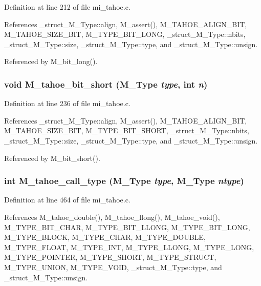 Definition at line 212 of file mi\_\-tahoe.c.

References \_\-struct\_\-M\_\-Type::align, M\_\-assert(), M\_\-TAHOE\_\-ALIGN\_\-BIT, M\_\-TAHOE\_\-SIZE\_\-BIT, M\_\-TYPE\_\-BIT\_\-LONG, \_\-struct\_\-M\_\-Type::nbits, \_\-struct\_\-M\_\-Type::size, \_\-struct\_\-M\_\-Type::type, and \_\-struct\_\-M\_\-Type::unsign.

Referenced by M\_\-bit\_\-long().
\subsubsection{\setlength{\rightskip}{0pt plus 5cm}void M\_\-tahoe\_\-bit\_\-short (\bf{M\_\-Type} {\em type}, int {\em n})}\label{mi__tahoe_8c_29a13507ca727d0d1b9f9f0c964140fe}




Definition at line 236 of file mi\_\-tahoe.c.

References \_\-struct\_\-M\_\-Type::align, M\_\-assert(), M\_\-TAHOE\_\-ALIGN\_\-BIT, M\_\-TAHOE\_\-SIZE\_\-BIT, M\_\-TYPE\_\-BIT\_\-SHORT, \_\-struct\_\-M\_\-Type::nbits, \_\-struct\_\-M\_\-Type::size, \_\-struct\_\-M\_\-Type::type, and \_\-struct\_\-M\_\-Type::unsign.

Referenced by M\_\-bit\_\-short().
\subsubsection{\setlength{\rightskip}{0pt plus 5cm}int M\_\-tahoe\_\-call\_\-type (\bf{M\_\-Type} {\em type}, \bf{M\_\-Type} {\em ntype})}\label{mi__tahoe_8c_562c80bd43de27fd0c1765eb10972403}




Definition at line 464 of file mi\_\-tahoe.c.

References M\_\-tahoe\_\-double(), M\_\-tahoe\_\-llong(), M\_\-tahoe\_\-void(), M\_\-TYPE\_\-BIT\_\-CHAR, M\_\-TYPE\_\-BIT\_\-LLONG, M\_\-TYPE\_\-BIT\_\-LONG, M\_\-TYPE\_\-BLOCK, M\_\-TYPE\_\-CHAR, M\_\-TYPE\_\-DOUBLE, M\_\-TYPE\_\-FLOAT, M\_\-TYPE\_\-INT, M\_\-TYPE\_\-LLONG, M\_\-TYPE\_\-LONG, M\_\-TYPE\_\-POINTER, M\_\-TYPE\_\-SHORT, M\_\-TYPE\_\-STRUCT, M\_\-TYPE\_\-UNION, M\_\-TYPE\_\-VOID, \_\-struct\_\-M\_\-Type::type, and \_\-struct\_\-M\_\-Type::unsign.

